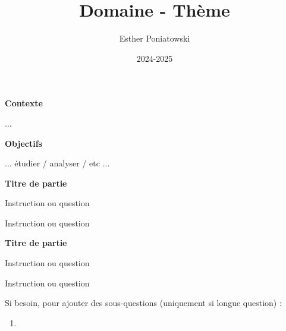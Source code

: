 \documentclass[10pt,a4paper]{article}
\title{Domaine - Thème}
\author{Esther Poniatowski}
\date{2024-2025}
\begin{document}
\textbf{Contexte}

...

\bigskip
\textbf{Objectifs}

... étudier / analyser / etc ...


\bigskip
\textbf{Titre de partie}

\q Instruction ou question

\q Instruction ou question

\bigskip
\textbf{Titre de partie}

\q Instruction ou question

\q Instruction ou question

Si besoin, pour ajouter des sous-questions (uniquement si longue question) :
\begin{enumerate}
    \item
\end{enumerate}
\end{document}

